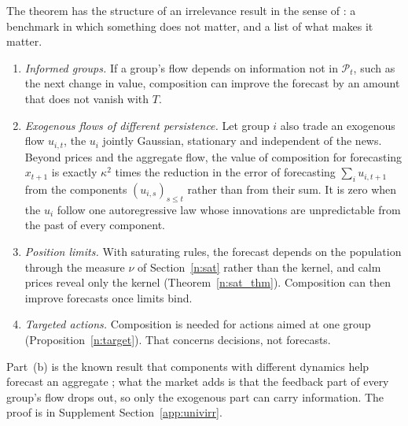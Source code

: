 The theorem has the structure of an irrelevance result in the sense of \citet{mm1958}: a benchmark in which something does not matter, and a list of what makes it matter.

\begin{proposition}\label{n:exc}
\begin{enumerate}[label=(\alph*),itemsep=1pt]
\item \emph{Informed groups.} If a group's flow depends on information not in $\mathcal P_t$, such as the next change in value, composition can improve the forecast by an amount that does not vanish with $T$.
\item \emph{Exogenous flows of different persistence.} Let group $i$ also trade an exogenous flow $u_{i,t}$, the $u_i$ jointly Gaussian, stationary and independent of the news. Beyond prices and the aggregate flow, the value of composition for forecasting $x_{t+1}$ is exactly $\kappa^2$ times the reduction in the error of forecasting $\sum_iu_{i,t+1}$ from the components $(u_{i,s})_{s\le t}$ rather than from their sum. It is zero when the $u_i$ follow one autoregressive law whose innovations are unpredictable from the past of every component.
\item \emph{Position limits.} With saturating rules, the forecast depends on the population through the measure $\nu$ of Section~\ref{n:sat} rather than the kernel, and calm prices reveal only the kernel (Theorem~\ref{n:sat_thm}). Composition can then improve forecasts once limits bind.
\item \emph{Targeted actions.} Composition is needed for actions aimed at one group (Proposition~\ref{n:target}). That concerns decisions, not forecasts.
\end{enumerate}
\end{proposition}

Part~(b) is the known result that components with different dynamics help forecast an aggregate \citep{lutkepohl1987,hendry2011}; what the market adds is that the feedback part of every group's flow drops out, so only the exogenous part can carry information. The proof is in Supplement Section~\ref{app:univirr}.

